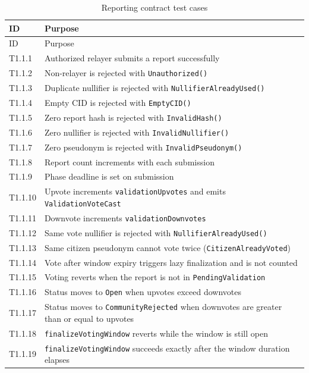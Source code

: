 \begin{longtable}{p{}|p{}}
\caption{Reporting contract test cases} \\

  {ID} &   {Purpose} \\
\hline
\endfirsthead
\hline
  {ID} &   {Purpose} \\
\hline
\endhead
T1.1.1 & Authorized relayer submits a report successfully \\
\hline
T1.1.2 & Non-relayer is rejected with \texttt{Unauthorized()} \\
\hline
T1.1.3 & Duplicate nullifier is rejected with \texttt{NullifierAlreadyUsed()} \\
\hline
T1.1.4 & Empty CID is rejected with \texttt{EmptyCID()} \\
\hline
T1.1.5 & Zero report hash is rejected with \texttt{InvalidHash()} \\
\hline
T1.1.6 & Zero nullifier is rejected with \texttt{InvalidNullifier()} \\
\hline
T1.1.7 & Zero pseudonym is rejected with \texttt{InvalidPseudonym()} \\
\hline
T1.1.8 & Report count increments with each submission \\
\hline
T1.1.9 & Phase deadline is set on submission \\
\hline
T1.1.10 & Upvote increments \texttt{validationUpvotes} and emits \texttt{ValidationVoteCast} \\
\hline
T1.1.11 & Downvote increments \texttt{validationDownvotes} \\
\hline
T1.1.12 & Same vote nullifier is rejected with \texttt{NullifierAlreadyUsed()} \\
\hline
T1.1.13 & Same citizen pseudonym cannot vote twice (\texttt{CitizenAlreadyVoted}) \\
\hline
T1.1.14 & Vote after window expiry triggers lazy finalization and is not counted \\
\hline
T1.1.15 & Voting reverts when the report is not in \texttt{PendingValidation} \\
\hline
T1.1.16 & Status moves to \texttt{Open} when upvotes exceed downvotes \\
\hline
T1.1.17 & Status moves to \texttt{CommunityRejected} when downvotes are greater than or equal to upvotes \\
\hline
T1.1.18 & \texttt{finalizeVotingWindow} reverts while the window is still open \\
\hline
T1.1.19 & \texttt{finalizeVotingWindow} succeeds exactly after the window duration elapses \\

\end{longtable}
